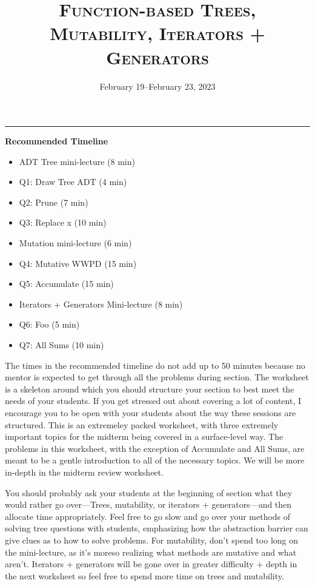 \documentclass{exam}
\title{\textsc{Function-based Trees, Mutability, Iterators + Generators}}
\date{February 19--February 23, 2023}
\begin{document}
\maketitle
\rule{\textwidth}{0.15em}


\begin{meta}
\textbf{Recommended Timeline}
\begin{itemize}
    \item ADT Tree mini-lecture (8 min)
    \item Q1: Draw Tree ADT (4 min)
    \item Q2: Prune (7 min)
    \item Q3: Replace x (10 min)
    \item Mutation mini-lecture (6 min)
    \item Q4: Mutative WWPD (15 min)
    \item Q5: Accumulate (15 min)
    \item Iterators + Generators Mini-lecture (8 min)
    \item Q6: Foo (5 min)
    \item Q7: All Sums (10 min)
\end{itemize}
The times in the recommended timeline do not add up to 50 minutes because no mentor
is expected to get through all the problems during section. The worksheet is a skeleton
around which you should structure your section to best meet the needs of your students.
If you get stressed out about covering a lot of content, I encourage you to be open with
your students about the way these sessions are structured. This is an extremeley packed worksheet, with three extremely
important topics for the midterm being covered in a surface-level way. The problems in this worksheet, with the exception of Accumulate 
and All Sums, are meant to be a gentle introduction to all of the necessary topics. We will be more in-depth in the midterm review worksheet.

You should probably ask your students at the beginning of section what they would rather go
over---Trees, mutability, or iterators + generators---and then allocate time appropriately.
Feel free to go slow and go over your methods of solving tree questions with students, emphasizing how the abstraction barrier can give clues 
as to how to solve problems. For mutability, don't spend too long on the mini-lecture, as it's moreso realizing what methods are mutative and what aren't.
Iterators + generators will be gone over in greater difficulty + depth in the next worksheet so feel free to spend more time on trees and mutability.
\end{meta}
\end{document}
